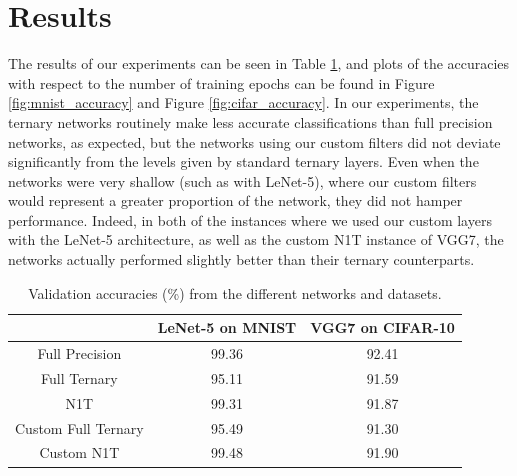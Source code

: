\documentclass[11pt,a4paper,oldfontcommands]{memoir}
\begin{document}
\section{Results}
The results of our experiments can be seen in Table \ref{tab:res_max_accuracy}, and plots of the accuracies with respect to the number of training epochs can be found in Figure \ref{fig:mnist_accuracy} and Figure \ref{fig:cifar_accuracy}. In our experiments, the ternary networks routinely make less accurate classifications than full precision networks, as expected, but the networks using our custom filters did not deviate significantly from the levels given by standard ternary layers. Even when the networks were very shallow (such as with LeNet-5), where our custom filters would represent a greater proportion of the network, they did not hamper performance. Indeed, in both of the instances where we used our custom layers with the LeNet-5 architecture, as well as the custom N1T instance of VGG7, the networks actually performed slightly better than their ternary counterparts. 

\begin{table}[h]
\centering
    \begin{tabular}{|c|c|c|} 
        \hline
        & LeNet-5 on MNIST & VGG7 on CIFAR-10 \\
        \hline
        Full Precision & 99.36 & 92.41 \\
        Full Ternary & 95.11 & 91.59 \\
        N1T & 99.31 & 91.87 \\
        \hline
        Custom Full Ternary & 95.49 & 91.30 \\
        Custom N1T & 99.48 & 91.90 \\
        \hline
    \end{tabular}
\caption{Validation accuracies (\%) from the different networks and datasets.}
\label{tab:res_max_accuracy}
\end{table}
\end{document}

